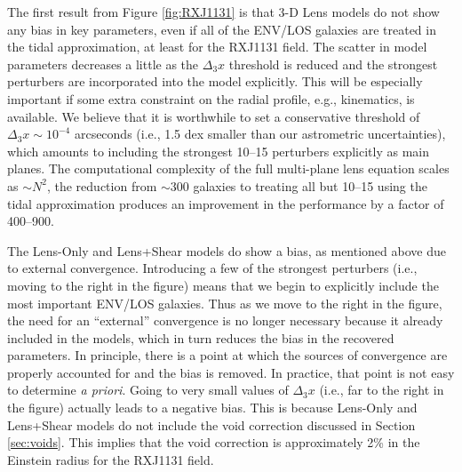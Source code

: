 \documentclass{emulateapj}
\begin{document}
The first result from Figure \ref{fig:RXJ1131} is that 3-D Lens models do not show any bias in key parameters, even if all of the ENV/LOS galaxies are treated in the tidal approximation, at least for the RXJ1131 field. The scatter in model parameters decreases a little as the $\Delta_3 x$ threshold is reduced and the strongest perturbers are incorporated into the model explicitly. This will be especially important if some extra constraint on the radial profile, e.g., kinematics, is available.  We believe that it is worthwhile to set a conservative threshold of $\Delta_3 x \sim 10^{-4}$ arcseconds (i.e., 1.5 dex smaller than our astrometric uncertainties), which amounts to including the strongest 10--15 perturbers explicitly as main planes. The computational complexity of the full multi-plane lens equation scales as $\sim N^2$, the reduction from $\sim 300$ galaxies to treating all but 10--15 using the tidal approximation produces an improvement in the performance by a factor of 400--900.

The Lens-Only and Lens+Shear models do show a bias, as mentioned above due to external convergence. Introducing a few of the strongest perturbers (i.e., moving to the right in the figure) means that we begin to explicitly include the most important ENV/LOS galaxies. Thus as we move to the right in the figure, the need for an ``external'' convergence is no longer necessary because it already included in the models, which in turn reduces the bias in the recovered parameters.  In principle, there is a point at which the sources of convergence are properly accounted for and the bias is removed.  In practice, that point is not easy to determine \emph{a priori}.  Going to very small values of $\Delta_3 x$ (i.e., far to the right in the figure) actually leads to a negative bias.  This is because Lens-Only and Lens+Shear models do not include the void correction discussed in Section \ref{sec:voids}.  This implies that the void correction is approximately 2\% in the Einstein radius for the RXJ1131 field.
\end{document}
